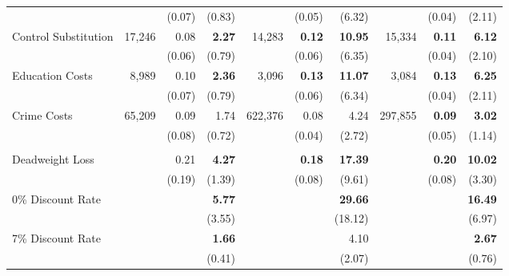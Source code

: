 \documentclass[static]{JJH-Beamer}
\begin{document}
\begin{frame}[shrink=10]
\begin{table}[H]
\begin{center}
\begin{tabular}{l r r r r r r r r r}
	&		&	(0.07)	&	(0.83)	&		&	(0.05)	&	(6.32)	&		&	(0.04)	&	(2.11)	\\
Control Substitution	&	17,246	&	0.08	&	\textbf{2.27}	&	14,283	&	\textbf{0.12}	&	\textbf{10.95}	&	15,334	&	\textbf{0.11}	&	\textbf{6.12}	\\
	&		&	(0.06)	&	(0.79)	&		&	(0.06)	&	(6.35)	&		&	(0.04)	&	(2.10)	\\
Education Costs	&	8,989	&	0.10	&	\textbf{2.36}	&	3,096	&	\textbf{0.13}	&	\textbf{11.07}	&	3,084	&	\textbf{0.13}	&	\textbf{6.25}	\\
	&		&	(0.07)	&	(0.79)	&		&	(0.06)	&	(6.34)	&		&	(0.04)	&	(2.11)	\\
Crime Costs	&	65,209	&	0.09	&	1.74	&	622,376	&	0.08	&	4.24	&	297,855	&	\textbf{0.09}	&	\textbf{3.02}	\\
	&		&	(0.08)	&	(0.72)	&		&	(0.04)	&	(2.72)	&		&	(0.05)	&	(1.14)	\\ \\
Deadweight Loss	&		&	0.21	&	\textbf{4.27}	&		&	\textbf{0.18}	&	\textbf{17.39}	&		&	\textbf{0.20}	&	\textbf{10.02}	\\
	&		&	(0.19)	&	(1.39)	&		&	(0.08)	&	(9.61)	&		&	(0.08)	&	(3.30)	\\
0\% Discount Rate	&		&		&	\textbf{5.77}	&		&		&	\textbf{29.66}	&		&		&	\textbf{16.49}	\\
	&		&		&	(3.55)	&		&		&	(18.12)	&		&		&	(6.97)	\\
7\% Discount Rate	&		&		&	\textbf{1.66}	&		&		&	4.10	&		&		&	\textbf{2.67}	\\
	&		&		&	(0.41)	&		&		&	(2.07)	&		&		&	(0.76)	\\
\bottomrule																			
\end{tabular}		
\end{center}
\end{table}

\end{frame}
\end{document}
